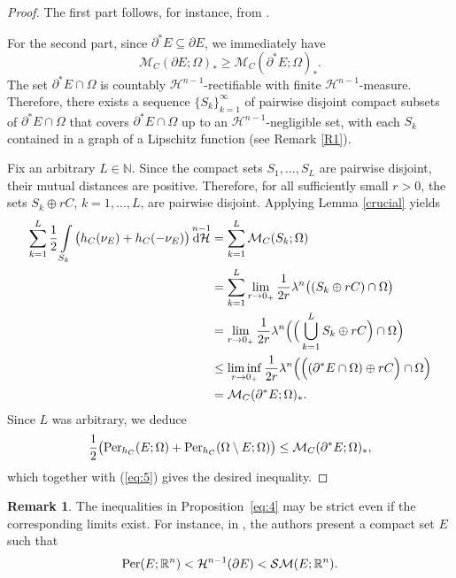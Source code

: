 \documentclass[pdflatex,sn-mathphys-num]{sn-jnl}
\theoremstyle{plain}
\theoremstyle{definition}
\newtheorem{rem}[theorem]{Remark}
\DeclareMathOperator{\Per}{\textup{Per}}
\DeclareMathOperator{\difm}{\textup{d$\mathcal{H}$}}
\begin{document}
\begin{proof}
The first part follows, for instance, from \cite[Theorem 3.1]{chambolle}.

For the second part, since $\partial^* E \subseteq \partial E$, we immediately have
\begin{equation}\label{eq:5}
    \mathcal{M}_{C}(\partial E; \Omega)_* \geq \mathcal{M}_{C}(\partial^* E; \Omega)_*.
\end{equation}
The set $\partial^* E \cap \Omega$ is countably $\mathcal{H}^{n-1}$-rectifiable with finite $\mathcal{H}^{n-1}$-measure. Therefore, there exists a sequence $\{S_k\}_{k=1}^{\infty}$ of pairwise disjoint compact subsets of $\partial^* E \cap \Omega$ that covers $\partial^* E \cap \Omega$ up to an $\mathcal{H}^{n-1}$-negligible set, with each $S_k$ contained in a graph of a Lipschitz function (see Remark \ref{R1}).

Fix an arbitrary $L\in\mathbb{N}$. Since the compact sets $S_1,\dots,S_L$ are pairwise disjoint, their mutual distances are positive. Therefore, for all sufficiently small $r>0$, the sets $S_k\oplus rC$, $k=1, \dots, L$, are pairwise disjoint. Applying Lemma \ref{crucial} yields
\begin{equation}\label{eq:6}
\begin{split}
    \sum_{k=1}^{L} \frac{1}{2}\int\limits_{S_k} \big(h_C(\nu_E)+h_C(-\nu_E)\big) \difm^{n-1} 
    &= \sum_{k=1}^L \mathcal{M}_{C}(S_k; \Omega)\\
    &= \sum_{k=1}^L \lim_{r\to0_+} \frac{1}{2r} \lambda^n \big((S_k \oplus r C) \cap \Omega\big)\\
    &= \lim_{r\to0_+} \frac{1}{2r} \lambda^n \Big(\Big(\bigcup_{k=1}^L S_k \oplus r C \Big) \cap \Omega \Big)\\
    &\leq \liminf_{r\to0_+} \frac{1}{2r} \lambda^n \Big(\Big((\partial^* E \cap \Omega) \oplus r C \Big) \cap \Omega \Big)\\
    &= \mathcal{M}_{C}(\partial^* E; \Omega)_*.
\end{split}
\end{equation}
Since $L$ was arbitrary, we deduce
\[
    \frac{1}{2} \big(\textup{Per}_{h_C}(E; \Omega)+\textup{Per}_{h_C}(\Omega\setminus E; \Omega)\big) \leq \mathcal{M}_{C}(\partial^* E; \Omega)_*,
\]
which together with (\ref{eq:5}) gives the desired inequality.
\end{proof}


\begin{rem}
The inequalities in Proposition~\ref{eq:4} may be strict even if the corresponding limits exist. For instance, in \cite[Example~1]{Villa4}, the authors present a compact set $E$ such that
\[
\Per(E; \mathbb{R}^n)<\mathcal{H}^{n-1}(\partial E)<\mathcal{SM}(E; \mathbb{R}^n).
\]
\end{rem}
\end{document}
